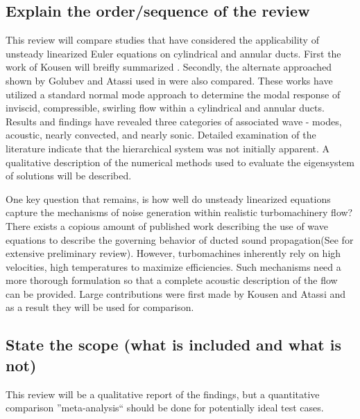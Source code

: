 \subsection{Explain the order/sequence of the review}
This review will compare studies that have considered the applicability of unsteady linearized Euler equations on cylindrical and annular ducts. First the work of Kousen will breifly summarized \cite{Kousen1996,Kousen1999}. Secondly, the alternate approached shown by Golubev and Atassi used in \cite{Golubev1996,Golubev1998} were also compared. These works have utilized a standard normal mode approach to determine the modal response of inviscid, compressible, swirling flow within a cylindrical and annular ducts. Results and findings have revealed three categories of associated wave - modes, acoustic, nearly convected, and nearly sonic. Detailed examination of the literature indicate that the hierarchical system was not initially apparent. A qualitative description of the numerical methods used to evaluate the eigensystem of solutions will be described.

One key question that remains, is how well do unsteady linearized equations capture the mechanisms of noise generation within realistic turbomachinery flow? There exists a copious amount of published work describing the use of wave equations to describe the governing behavior of ducted sound propagation(See \cite{Michel2008} for extensive preliminary review). However, turbomachines inherently rely on high velocities, high temperatures to maximize efficiencies. Such mechanisms need a more thorough formulation so that a complete acoustic description of the flow can be provided. Large contributions were first made by Kousen and Atassi and as a result they will be used for comparison.

\subsection{State the scope (what is included and what is not)}
This review will be a qualitative report of the findings, but a quantitative comparison ''meta-analysis`` should be done for potentially ideal test cases.
